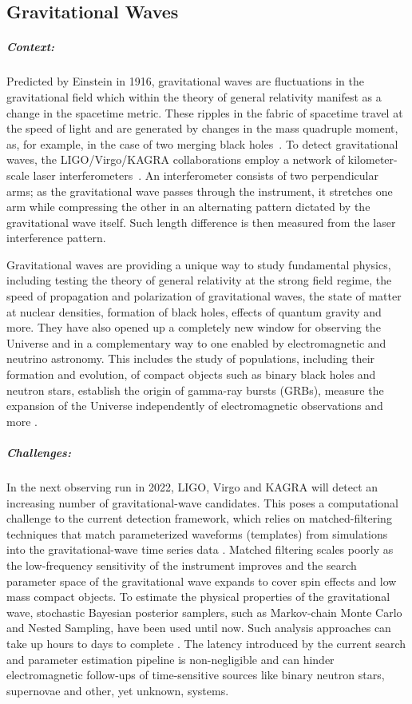 \subsection{Gravitational Waves}
\subparagraph*{Context:}
        Predicted by Einstein in 1916, gravitational waves are fluctuations in the gravitational field which within the theory of general relativity manifest as a change in the spacetime metric. 
        These ripples in the fabric of spacetime travel at the speed of light and are generated by changes in the mass quadruple moment, as, for example, in the case of two merging black holes~\cite{PhysRevLett.116.061102}.
        To detect gravitational waves, the LIGO/Virgo/KAGRA collaborations employ a network of kilometer-scale laser interferometers~\cite{aLIGO, Acernese_2014, Affeldt_2014, PhysRevD.88.043007}.
        An interferometer consists of two perpendicular arms; as the gravitational wave passes through the instrument, it stretches one arm while compressing the other in an alternating pattern dictated by the gravitational wave itself. 
        Such length difference is then measured from the laser interference pattern.
        
        Gravitational waves are providing a unique way to study fundamental physics, including testing the theory of general relativity at the strong field regime, the speed of propagation and polarization of gravitational waves, the state of matter at nuclear densities, formation of black holes, effects of quantum gravity and more.
        They have also opened up a completely new window for observing the Universe and in a complementary way to one enabled by electromagnetic and neutrino astronomy.
        This includes the study of populations, including their formation and evolution, of compact objects such as binary black holes and neutron stars, establish the origin of gamma-ray bursts (GRBs), measure the expansion of the Universe independently of electromagnetic observations and more \cite{PhysRevLett.119.161101}. 
        
\subparagraph*{Challenges:}
        In the next observing run in 2022, LIGO, Virgo and KAGRA will detect an increasing number of gravitational-wave candidates. 
        This poses a computational challenge to the current detection framework, which relies on matched-filtering techniques that match parameterized waveforms (templates) from simulations into the gravitational-wave time series data \cite{PhysRevLett.116.061102, Vas2001, PhysRevD.44.3819}.
        Matched filtering scales poorly as the low-frequency sensitivity of the instrument improves and the search parameter space of the gravitational wave expands to cover spin effects and low mass compact objects.
        To estimate the physical properties of the gravitational wave, stochastic Bayesian posterior samplers, such as Markov-chain Monte Carlo and Nested Sampling, have been used until now. 
        Such analysis approaches can take up hours to days to complete \cite{Abbott_2016}.
        The latency introduced by the current search and parameter estimation pipeline is non-negligible and can hinder electromagnetic follow-ups of time-sensitive sources like binary neutron stars, supernovae and other, yet unknown, systems.
        
